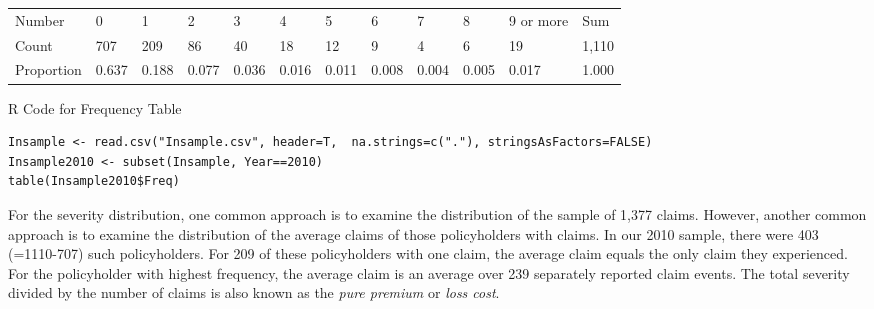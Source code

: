\documentclass[]{book}
\theoremstyle{definition}
\theoremstyle{definition}
\theoremstyle{definition}
\theoremstyle{remark}
\begin{document}
\begin{longtable}[]{@{}llllllllllll@{}}
\begin{minipage}[b]{0.08\columnwidth}
\strut
\end{minipage} & \begin{minipage}[b]{0.08\columnwidth}\raggedright\strut
\strut
\end{minipage} & \begin{minipage}[b]{0.08\columnwidth}\raggedright\strut
\strut
\end{minipage} & \begin{minipage}[b]{0.08\columnwidth}\raggedright\strut
\strut
\end{minipage} & \begin{minipage}[b]{0.08\columnwidth}\raggedright\strut
\strut
\end{minipage} & \begin{minipage}[b]{0.08\columnwidth}\raggedright\strut
\strut
\end{minipage} & \begin{minipage}[b]{0.08\columnwidth}\raggedright\strut
\strut
\end{minipage} & \begin{minipage}[b]{0.08\columnwidth}\raggedright\strut
\strut
\end{minipage} & \begin{minipage}[b]{0.08\columnwidth}\raggedright\strut
\strut
\end{minipage}\tabularnewline
\midrule
\endhead
Number & 0 & 1 & 2 & 3 & 4 & 5 & 6 & 7 & 8 & 9 or more &
Sum\tabularnewline
Count & 707 & 209 & 86 & 40 & 18 & 12 & 9 & 4 & 6 & 19 &
1,110\tabularnewline
Proportion & 0.637 & 0.188 & 0.077 & 0.036 & 0.016 & 0.011 & 0.008 &
0.004 & 0.005 & 0.017 & 1.000\tabularnewline
\bottomrule
\end{longtable}

R Code for Frequency Table

\hypertarget{display.T:Frequency.2}{}
\begin{verbatim}
Insample <- read.csv("Insample.csv", header=T,  na.strings=c("."), stringsAsFactors=FALSE)
Insample2010 <- subset(Insample, Year==2010)
table(Insample2010$Freq)
\end{verbatim}

For the severity distribution, one common approach is to examine the
distribution of the sample of 1,377 claims. However, another common
approach is to examine the distribution of the average claims of those
policyholders with claims. In our 2010 sample, there were 403
(=1110-707) such policyholders. For 209 of these policyholders with one
claim, the average claim equals the only claim they experienced. For the
policyholder with highest frequency, the average claim is an average
over 239 separately reported claim events. The total severity divided by
the number of claims is also known as the \emph{pure premium} or
\emph{loss cost}.
\end{document}
